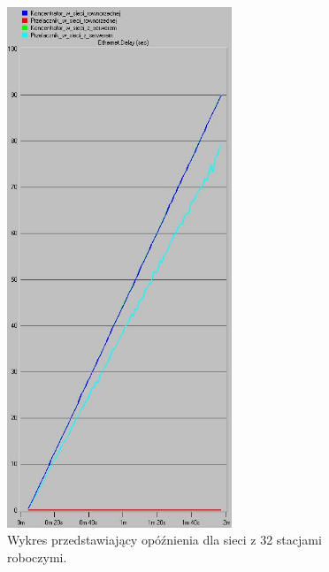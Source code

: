 \documentclass{article}
\begin{document}
\begin{figure}[H]
  \centering
  \includegraphics[width=0.60\textwidth]{screens/32_delay.png}
 \caption{Wykres przedstawiający opóźnienia dla sieci z 32 stacjami roboczymi.}
 \label{fig:32stacjed}
\end{figure}





\end{document}
